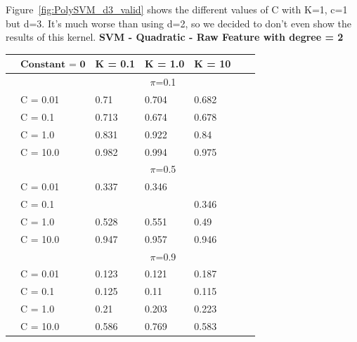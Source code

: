\documentclass[english]{report}
\begin{document}
Figure~\ref{fig:PolySVM_d3_valid} shows the different values of C with K=1, c=1 but d=3.
It's much worse than using d=2, so we decided to don't even show the results of this kernel.
\newpage
\textbf{SVM - Quadratic - Raw Feature with degree = 2}

\begin{table}[H]
    \centering
    \begin{tabular}{ll|lllll}
        \hline
                                &  $\textbf{Constant = 0}$       & K = 0.1 & K = 1.0 & K = 10 \\ \hline
                                & & \multicolumn{3}{c}{$\pi$=0.1} \\ \hline
                                & C = 0.01   & 0.71 & 0.704 & 0.682    \\
                                & C = 0.1    & 0.713 & 0.674 & 0.678  \\
                                & C = 1.0    & 0.831 & 0.922 & 0.84    \\
                                & C = 10.0   & 0.982 & 0.994 & 0.975  \\ \hline

                                & & \multicolumn{3}{c}{$\pi$=0.5} \\ \hline
                                & C = 0.01   & 0.337 & 0.346 & \color{red}{0.342}   \\
                                & C = 0.1    & \color{red}{0.324} & \color{red}{0.344} & 0.346  \\
                                & C = 1.0    & 0.528 & 0.551 & 0.49    \\
                                & C = 10.0   & 0.947 & 0.957 & 0.946  \\ \hline

                                & & \multicolumn{3}{c}{$\pi$=0.9} \\ \hline
                                & C = 0.01   & 0.123 & 0.121 & 0.187  \\
                                & C = 0.1    & 0.125 & 0.11 & 0.115  \\
                                & C = 1.0    & 0.21 & 0.203 & 0.223    \\
                                & C = 10.0   & 0.586 & 0.769 & 0.583  \\ 
    \hline
    \end{tabular}
    \label{tab:PolySVM_c0_valid}
\end{table}
\end{document}
